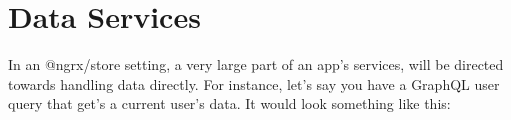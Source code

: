\maketitle{}
\section{ Data Services }

In an @ngrx/store setting, a very large part of an app's services, will be
directed towards handling data directly. For instance, let's say you have a
GraphQL user query that get's a current user's data. It would look something
like this:
\begin{lstlisting}

\end{lstlisting}
